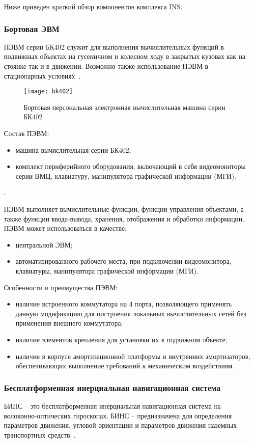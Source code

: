 Ниже приведен краткий обзор компонентов комплекса INS.

\subsubsection{Бортовая ЭВМ}
\label{sub:lit_review:ins:evm}
ПЭВМ серии БК402 служит для выполнения вычислительных функций в подвижных объектах на гусеничном и колесном ходу в закрытых кузовах
как на стоянке так и в движении. Возможно также использование ПЭВМ в стационарных условиях~\cite{bk402}.
\begin{figure}[ht]
	\centering
	\texttt{[image: bk402]}
	\caption{Бортовая персональная электронная вычислительная машина серии БК402~\cite{bk402}}
	\label{fig:lit_reiview:ins:evm:bk402}
\end{figure}

Состав ПЭВМ:
\begin{itemize}
	\item машина вычислительная серии БК402;
	\item комплект периферийного оборудования, включающий в себя видеомониторы серии ВМЦ, клавиатуру, манипулятора графической информации (МГИ).
\end{itemize}.

ПЭВМ выполняет вычислительные функции, функции управления объектами, а также функции ввода-вывода, хранения, отображения и обработки информации.
ПЭВМ может  использоваться в  качестве:
\begin{itemize}
	\item центральной ЭВМ;
	\item автоматизированного рабочего места, при подключении видеомонитора, клавиатуры, манипулятора графической информации (МГИ).
\end{itemize}

Особенности и преимущества ПЭВМ:
\begin{itemize}
	\item наличие встроенного коммутатора на 4 порта, позволяющего применять данную модификацию для построения
		локальных вычислительных сетей без применения внешнего коммутатора;
	\item наличие элементов крепления для установки их в подвижном объекте;
	\item наличие в корпусе амортизационной платформы и внутренних амортизаторов, обеспечивающих  выполнение требований к механическим воздействиям.
\end{itemize}

\subsubsection{Бесплатформенная инерциальная навигационная система}
\label{sub:lit_review:ins:bins}
БИНС -- это бесплатформенная инерциальная навигационная система на волоконно-оптических гироскопах.
БИНС -- предназначена для определения параметров движения, угловой ориентации и параметров движения наземных
транспортных средств~\cite{bins}.

